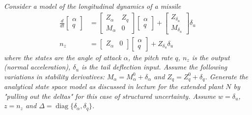 \documentclass{article}
\begin{document}
\section{}
\textit{Consider a model of the longitudinal dynamics of a missile
\[
\begin{aligned}
\frac{d}{d t} \begin{bmatrix} \alpha \\ q \end{bmatrix} &= \begin{bmatrix} Z_\alpha & Z_q \\ M_\alpha & 0 \end{bmatrix} \begin{bmatrix} \alpha \\ q \end{bmatrix} + \begin{bmatrix} Z_{\delta_u} \\ M_{\delta_u} \end{bmatrix} \delta_u \\
n_z &= \begin{bmatrix} Z_\alpha & 0 \end{bmatrix} \begin{bmatrix} \alpha \\ q \end{bmatrix} + Z_{\delta_u} \delta_u
\end{aligned}
\]
where the states are the angle of attack $\alpha$, the pitch rate $q$, $n_z$ is the output (normal acceleration), $\delta_u$ is the tail deflection input. Assume the following variations in stability derivatives: $M_\alpha = M_\alpha^0 + \delta_\alpha$ and $Z_q = Z_q^0 + \delta_q$. Generate the analytical state space model as discussed in lecture for the extended plant $N$ by "pulling out the deltas" for this case of structured uncertainty. Assume $w = \delta_u$, $z = n_z$ and $\Delta = \operatorname{diag}\{\delta_\alpha, \delta_q\}$.}
\end{document}
